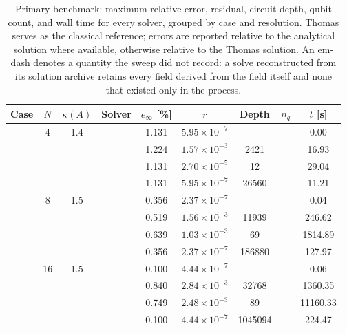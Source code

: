 \begin{table}[htbp]
  \centering
  \caption{Primary benchmark: maximum relative error, residual, circuit depth, qubit count, and wall time for every solver, grouped by case and resolution. Thomas serves as the classical reference; errors are reported relative to the analytical solution where available, otherwise relative to the Thomas solution. An em-dash denotes a quantity the sweep did not record: a solve reconstructed from its solution archive retains every field derived from the field itself and none that existed only in the process.}
  \label{tab:primary_comparison}
  \begin{tabular}{l S[table-format=3.0] S[table-format=4.1] l S[table-format=3.3] S[table-format=1.2e2] S[table-format=6.0] S[table-format=2.0] S[table-format=4.2]}
    \toprule
    {Case} & {$N$} & {$\kappa(A)$} & {Solver} & {$e_\infty$ [\%]} & {$r$} & {Depth} & {$n_q$} & {$t$ [s]} \\
    \midrule
     & 4 & 1.4 &  & 1.131 & $5.95 \times 10^{-7}$ & {\text{---}} & {\text{---}} & 0.00 \\
     &  &  &  & 1.224 & $1.57 \times 10^{-3}$ & 2421 & {\text{---}} & 16.93 \\
     &  &  &  & 1.131 & $2.70 \times 10^{-5}$ & 12 & {\text{---}} & 29.04 \\
     &  &  &  & 1.131 & $5.95 \times 10^{-7}$ & 26560 & {\text{---}} & 11.21 \\
     & 8 & 1.5 &  & 0.356 & $2.37 \times 10^{-7}$ & {\text{---}} & {\text{---}} & 0.04 \\
     &  &  &  & 0.519 & $1.56 \times 10^{-3}$ & 11939 & {\text{---}} & 246.62 \\
     &  &  &  & 0.639 & $1.03 \times 10^{-3}$ & 69 & {\text{---}} & 1814.89 \\
     &  &  &  & 0.356 & $2.37 \times 10^{-7}$ & 186880 & {\text{---}} & 127.97 \\
     & 16 & 1.5 &  & 0.100 & $4.44 \times 10^{-7}$ & {\text{---}} & {\text{---}} & 0.06 \\
     &  &  &  & 0.840 & $2.84 \times 10^{-3}$ & 32768 & {\text{---}} & 1360.35 \\
     &  &  &  & 0.749 & $2.48 \times 10^{-3}$ & 89 & {\text{---}} & 11160.33 \\
     &  &  &  & 0.100 & $4.44 \times 10^{-7}$ & 1045094 & {\text{---}} & 224.47 \\

\end{tabular}
\end{table}
